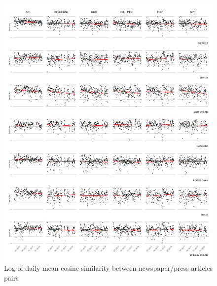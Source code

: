 \documentclass[
]{article}
\begin{document}
\begin{figure}

{\centering \includegraphics[width=1\linewidth]{main_text_files/figure-latex/Daily mean cosine similarity-1} 

}

\caption{Log of daily mean cosine similarity between newspaper/press articles pairs \label{fig:mean_cosine_sim_ols}}\label{fig:Daily mean cosine similarity}
\end{figure}
\end{document}
